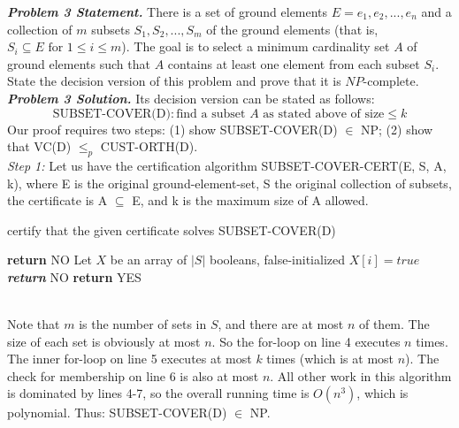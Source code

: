 \documentclass[10pt, letterpaper, twosided]{article}
\begin{document}
\newpage

\emph{\textbf{Problem 3 Statement.}} There is a set of ground elements $E={e_1,e_2,...,e_n}$ and a collection of $m$ subsets $S_1, S_2,...,S_m$ of the ground elements (that is, $S_i \subseteq E \text{ for } 1 \leq i \leq m$).  The goal is
to select a minimum cardinality set $A$ of ground elements such that $A$ contains at least one element from each 
subset $S_i$.  State the decision version of this problem and prove that it is $NP$-complete.\\

\emph{\textbf{Problem 3 Solution.}} Its decision version can be stated as follows:
$$ \text{SUBSET-COVER(D)} : \text{find a subset $A$ as stated above of size} \leq k$$
Our proof requires two steps: (1) show SUBSET-COVER(D) $\in$ NP; (2) show that
VC(D) $\leq_{p}$ CUST-ORTH(D).\\

\textit{Step 1:}
Let us have the certification algorithm SUBSET-COVER-CERT(E, S, A, k), where E 
is the original ground-element-set, S the original collection of subsets, the certificate is A $\subseteq$ E, 
and k is the maximum size of A allowed.
\begin{algorithm}
\caption{certify that the given certificate solves SUBSET-COVER(D)}\label{ram}
\begin{algorithmic}[1]
      \State \textbf{return} NO
   \EndIf
   \State Let $X$ be an array of $|S|$ booleans, false-initialized
            \State $X[i] = true$
         \EndIf
      \EndFor
   \EndFor
      \State \emph{\textbf{return}} NO
   \EndIf
   \State \textbf{return} YES
\EndProcedure
\end{algorithmic}
\end{algorithm}\\
Note that $m$ is the number of sets in $S$, and there are at most $n$ of them.  The size of each set is obviously at most
$n$.  So the for-loop on line 4 executes $n$ times.  The inner for-loop on line 5 executes at most $k$ times (which is at
most $n$).  The check for membership on line 6 is also at most $n$.  All other work in this algorithm is dominated by lines 4-7, so the overall running time is $O(n^3)$, which is polynomial.  Thus:  SUBSET-COVER(D) $\in$ NP.\\
\end{document}

